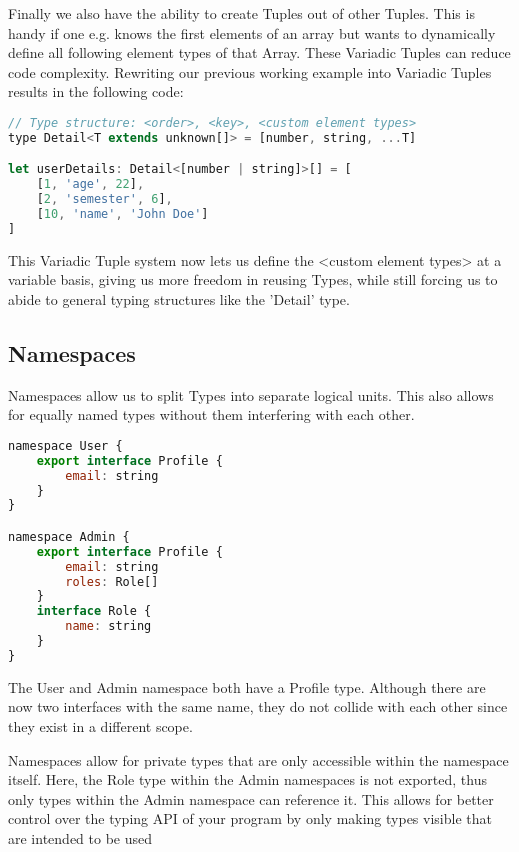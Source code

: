 \documentclass[letterpaper,runningheads]{llncs}
\begin{document}
Finally we also have the ability to create Tuples out of other Tuples.
This is handy if one e.g. knows the first elements of an array but
wants to dynamically define all following element types of that Array.
These Variadic Tuples can reduce code complexity. Rewriting our previous
working example into Variadic Tuples results in the following code:

\begin{lstlisting}[style=ES6, language=JavaScript, caption="Variadic Tuples"]
// Type structure: <order>, <key>, <custom element types>
type Detail<T extends unknown[]> = [number, string, ...T]

let userDetails: Detail<[number | string]>[] = [
	[1, 'age', 22],
	[2, 'semester', 6],
	[10, 'name', 'John Doe']
]
\end{lstlisting}

\begin{remark}
This Variadic Tuple system now lets us define the <custom element
types> at a variable basis, giving us more freedom in reusing Types,
while still forcing us to abide to general typing structures like
the 'Detail' type.
\end{remark}


\subsection{Namespaces}

Namespaces allow us to split Types into separate logical units. This
also allows for equally named types without them interfering with
each other.

\begin{lstlisting}[style=ES6, language=JavaScript, caption="Variadic Tuples"]
namespace User {
	export interface Profile {
		email: string
	}
}

namespace Admin {
	export interface Profile {
		email: string
		roles: Role[]
	}
	interface Role {
		name: string
	}
}
\end{lstlisting}

\begin{note}
The User and Admin namespace both have a Profile type. Although there
are now two interfaces with the same name, they do not collide with
each other since they exist in a different scope.
\end{note}

\begin{note}
Namespaces allow for private types that are only accessible within
the namespace itself. Here, the Role type within the Admin namespaces
is not exported, thus only types within the Admin namespace can reference
it. This allows for better control over the typing API of your program
by only making types visible that are intended to be used
\end{note}
\end{document}
